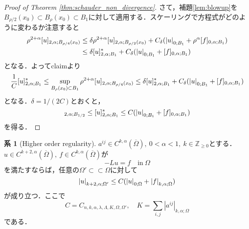 \documentclass[a4paper]{ltjsarticle}
\newcommand{\Zset}{\mathbb{Z}}
\newcommand{\Om}{\Omega}
\newcommand{\Ombar}{\overline{\Omega}}
\newcommand{\ssubset}{\subset\subset}
\newcommand{\inn}{\quad\text{in}\ }
\newcommand{\1}{\mathbbm{1}}
\numberwithin{equation}{section}
\theoremstyle{definition}
\newtheorem{cor}[thm]{系}
\begin{document}
\begin{proof}[Proof of Theorem \ref{thm:schauder_non_divergence}]
    さて，補題\ref{lem:blowup}を$B_{\rho/2}(x_0)\subset B_\rho(x_0)\subset B_1$に対して適用する．スケーリングで方程式がどのように変わるか注意すると
    \begin{align}
        \rho^{2+\alpha}[u]_{2,\alpha;B_{\rho/4}(x_0)}&\leq \delta \rho^{2+\alpha}[u]_{2,\alpha;B_{\rho/2}(x_0)}+C_\delta (\abs{u}_{0;B_1}+\rho^\alpha [f]_{0,\alpha;B_1})\\
        &\leq \delta [u]_{2,\alpha;B_1}^\ast+C_\delta(\abs{u}_{0;B_1}+[f]_{0,\alpha;B_1})
     \end{align}
     となる．よってclaimより
     \begin{equation}
        \frac{1}{C}[u]_{2,\alpha;B_1}^\ast\leq \sup_{B_\rho(x_0)\subset B_1}\rho^{2+\alpha}[u]_{2,\alpha;B_{\rho/4}(x_0)}\leq \delta [u]_{2,\alpha;B_1}^\ast+C_\delta(\abs{u}_{0;B_1}+[f]_{0,\alpha;B_1})
     \end{equation}
     となる．$\delta=1/(2C)$とおくと，
     \begin{equation}
        [u]_{2,\alpha;B_{1/2}}\leq [u]_{2,\alpha;B_1}^\ast\leq C(\abs{u}_{0;B_1}+[f]_{0,\alpha;B_1})
     \end{equation}
     を得る．
\end{proof}
\begin{cor}[Higher order regularity]
    $a^{ij}\in C^{k,\alpha}(\Ombar),\ 0<\alpha<1,\ k\in\Zset_{\geq0}$とする．$u\in C^{k+2,\alpha}(\Ombar),\ f\in C^{k,\alpha}(\Ombar)$が
    \begin{equation}
        -Lu=f\inn \Om  
    \end{equation}
    を満たすならば，任意の$\Om'\ssubset \Om$に対して
    \begin{equation}
        \abs{u}_{k+2,\alpha;\Om'}\leq C(\abs{u}_{0;\Om}+\abs{f}_{k,\alpha;\Om})
    \end{equation}
    が成り立つ．ここで
    \begin{equation}
        C=C_{n,k,\alpha,\lambda,\Lambda,K,\Om,\Om'},\quad K=\sum_{i,j}|a^{ij}|_{k,\alpha;\Om} 
    \end{equation}
    である．
\end{cor}
\end{document}
